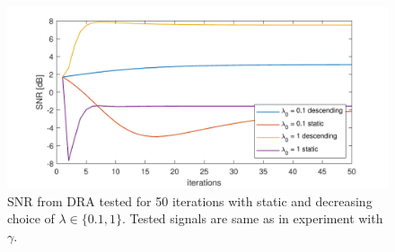 \documentclass[conference]{IEEEtran}
\newcommand{\todo}[1]{\textcolor{red}{#1}}
\begin{document}
\begin{figure}[!h]
	\centering
	\includegraphics[width=1\linewidth]{figures/lamda_desc}
	\caption{SNR from DRA tested for 50 iterations with static and decreasing choice of $\lambda \in \{0.1,1 \}$.
	Tested signals are same as in experiment with $\gamma$.}
	\label{fig:lamdadesc}
\end{figure}

\end{document}
